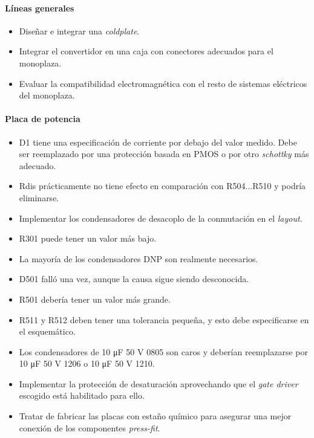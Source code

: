 \paragraph{Líneas generales}
\begin{itemize}
	\item Diseñar e integrar una \textit{coldplate}.
	\item Integrar el convertidor en una caja con conectores adecuados para el monoplaza.
	\item Evaluar la compatibilidad electromagnética con el resto de sistemas eléctricos del monoplaza.
\end{itemize}

\paragraph{Placa de potencia}
\begin{itemize}
	\item D1 tiene una especificación de corriente por debajo del valor medido. Debe ser reemplazado por una protección basada en PMOS o por otro \textit{schottky} más adecuado.
	\item Rdis prácticamente no tiene efecto en comparación con R504...R510 y podría eliminarse.
	\item Implementar los condensadores de desacoplo de la conmutación en el \textit{layout}.
	\item R301 puede tener un valor más bajo.
	\item La mayoría de los condensadores DNP son realmente necesarios.
	\item D501 falló una vez, aunque la causa sigue siendo desconocida.
	\item R501 debería tener un valor más grande.
	\item R511 y R512 deben tener una tolerancia pequeña, y esto debe especificarse en el esquemático.
	\item Los condensadores de 10 \unit{\micro\farad} 50 V 0805 son caros y deberían reemplazarse por 10 \unit{\micro\farad} 50 V 1206 o 10 \unit{\micro\farad} 50 V 1210.
	\item Implementar la protección de desaturación aprovechando que el \textit{gate driver} escogido está habilitado para ello.
	\item Tratar de fabricar las placas con estaño químico para asegurar una mejor conexión de los componentes \textit{press-fit}.	
\end{itemize}

